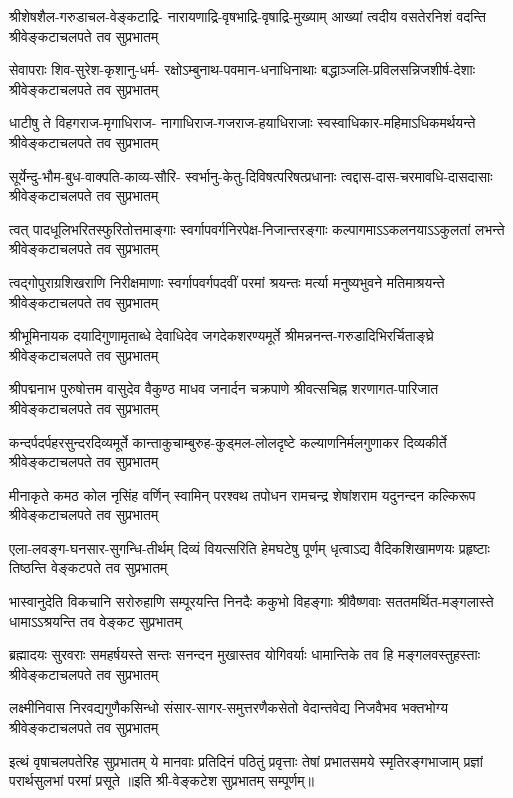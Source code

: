 \fourlineindentedshloka
{श्रीशेषशैल-गरुडाचल-वेङ्कटाद्रि-}
{नारायणाद्रि-वृषभाद्रि-वृषाद्रि-मुख्याम्}
{आख्यां त्वदीय वसतेरनिशं वदन्ति}
{श्रीवेङ्कटाचलपते तव सुप्रभातम्}

\fourlineindentedshloka
{सेवापराः शिव-सुरेश-कृशानु-धर्म-}
{रक्षोऽम्बुनाथ-पवमान-धनाधिनाथाः}
{बद्धाञ्जलि-प्रविलसन्निजशीर्ष-देशाः}
{श्रीवेङ्कटाचलपते तव सुप्रभातम्}

\fourlineindentedshloka
{धाटीषु ते विहगराज-मृगाधिराज-}
{नागाधिराज-गजराज-हयाधिराजाः}
{स्वस्वाधिकार-महिमाऽधिकमर्थयन्ते}
{श्रीवेङ्कटाचलपते तव सुप्रभातम्}

\fourlineindentedshloka
{सूर्येन्दु-भौम-बुध-वाक्पति-काव्य-सौरि-}
{स्वर्भानु-केतु-दिविषत्परिषत्प्रधानाः}
{त्वद्दास-दास-चरमावधि-दासदासाः}
{श्रीवेङ्कटाचलपते तव सुप्रभातम्}

\fourlineindentedshloka
{त्वत् पादधूलिभरितस्फुरितोत्तमाङ्गाः}
{स्वर्गापवर्गनिरपेक्ष-निजान्तरङ्गाः}
{कल्पागमाऽऽकलनयाऽऽकुलतां लभन्ते}
{श्रीवेङ्कटाचलपते तव सुप्रभातम्}

\fourlineindentedshloka
{त्वद्गोपुराग्रशिखराणि निरीक्षमाणाः}
{स्वर्गापवर्गपदवीं परमां श्रयन्तः}
{मर्त्या मनुष्यभुवने मतिमाश्रयन्ते}
{श्रीवेङ्कटाचलपते तव सुप्रभातम्}

\fourlineindentedshloka
{श्रीभूमिनायक दयादिगुणामृताब्धे}
{देवाधिदेव जगदेकशरण्यमूर्ते}
{श्रीमन्ननन्त-गरुडादिभिरर्चिताङ्घ्रे}
{श्रीवेङ्कटाचलपते तव सुप्रभातम्}

\fourlineindentedshloka
{श्रीपद्मनाभ पुरुषोत्तम वासुदेव}
{वैकुण्ठ माधव जनार्दन चक्रपाणे}
{श्रीवत्सचिह्न शरणागत-पारिजात}
{श्रीवेङ्कटाचलपते तव सुप्रभातम्}

\fourlineindentedshloka
{कन्दर्पदर्पहरसुन्दरदिव्यमूर्ते}
{कान्ताकुचाम्बुरुह-कुड्मल-लोलदृष्टे}
{कल्याणनिर्मलगुणाकर दिव्यकीर्ते}
{श्रीवेङ्कटाचलपते तव सुप्रभातम्}

\fourlineindentedshloka
{मीनाकृते कमठ कोल नृसिंह वर्णिन्}
{स्वामिन् परश्वथ तपोधन रामचन्द्र}
{शेषांशराम यदुनन्दन कल्किरूप}
{श्रीवेङ्कटाचलपते तव सुप्रभातम्}

\fourlineindentedshloka
{एला-लवङ्ग-घनसार-सुगन्धि-तीर्थम्}
{दिव्यं वियत्सरिति हेमघटेषु पूर्णम्}
{धृत्वाऽद्य वैदिकशिखामणयः प्रहृष्टाः}
{तिष्ठन्ति वेङ्कटपते तव सुप्रभातम्}

\fourlineindentedshloka
{भास्वानुदेति विकचानि सरोरुहाणि}
{सम्पूरयन्ति निनदैः ककुभो विहङ्गाः}
{श्रीवैष्णवाः सततमर्थित-मङ्गलास्ते}
{धामाऽऽश्रयन्ति तव वेङ्कट सुप्रभातम्}

\fourlineindentedshloka
{ब्रह्मादयः सुरवराः समहर्षयस्ते}
{सन्तः सनन्दन मुखास्तव योगिवर्याः}
{धामान्तिके तव हि मङ्गलवस्तुहस्ताः}
{श्रीवेङ्कटाचलपते तव सुप्रभातम्}

\fourlineindentedshloka
{लक्ष्मीनिवास निरवद्यगुणैकसिन्धो}
{संसार-सागर-समुत्तरणैकसेतो}
{वेदान्तवेद्य निजवैभव भक्तभोग्य}
{श्रीवेङ्कटाचलपते तव सुप्रभातम्}

\fourlineindentedshloka
{इत्थं वृषाचलपतेरिह सुप्रभातम्}
{ये मानवाः प्रतिदिनं पठितुं प्रवृत्ताः}
{तेषां प्रभातसमये स्मृतिरङ्गभाजाम्}
{प्रज्ञां परार्थसुलभां परमां प्रसूते}
॥इति श्री-वेङ्कटेश सुप्रभातम् सम्पूर्णम्॥